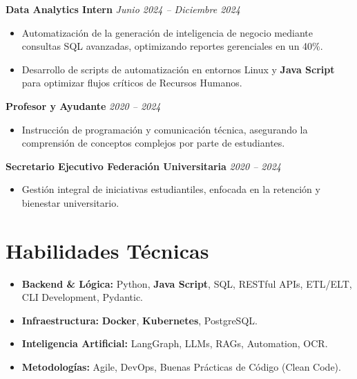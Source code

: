 \documentclass[a4paper, 10pt]{article}
\begin{document}
\vspace{0.2cm}

\textbf{Data Analytics Intern} \hfill \textit{Junio 2024 -- Diciembre 2024}
\begin{itemize}[noitemsep, leftmargin=*]
    \item Automatización de la generación de inteligencia de negocio mediante consultas SQL avanzadas, optimizando reportes gerenciales en un 40\%.
    \item Desarrollo de scripts de automatización en entornos Linux y \textbf{Java Script} para optimizar flujos críticos de Recursos Humanos.
\end{itemize}

\vspace{0.2cm}

\textbf{Profesor y Ayudante} \hfill \textit{2020 -- 2024}
\begin{itemize}[noitemsep, leftmargin=*]
    \item Instrucción de programación y comunicación técnica, asegurando la comprensión de conceptos complejos por parte de estudiantes.
\end{itemize}

\textbf{Secretario Ejecutivo Federación Universitaria} \hfill \textit{2020 -- 2024}
\begin{itemize}[noitemsep, leftmargin=*]
    \item Gestión integral de iniciativas estudiantiles, enfocada en la retención y bienestar universitario.
\end{itemize}

\vspace{0.3cm}

\section*{Habilidades Técnicas}
\begin{itemize}[noitemsep, leftmargin=*]
    \item \textbf{Backend & Lógica:} Python, \textbf{Java Script}, SQL, RESTful APIs, ETL/ELT, CLI Development, Pydantic.
    \item \textbf{Infraestructura:} \textbf{Docker}, \textbf{Kubernetes}, PostgreSQL.
    \item \textbf{Inteligencia Artificial:} LangGraph, LLMs, RAGs, Automation, OCR.
    \item \textbf{Metodologías:} Agile, DevOps, Buenas Prácticas de Código (Clean Code).
\end{itemize}
\end{document}
